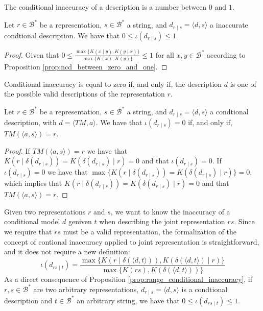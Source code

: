 The conditional inaccuracy of a description is a number between $0$ and $1$.

\begin{proposition}
\label{prop:range_conditional_inaccuracy}
Let $r \in \mathcal{B}^\ast$ be a representation, $s \in \mathcal{B}^\ast$ a string, and $d_{r \mid s} = \langle d, s \rangle$ a inaccurate condtional description. We have that $0 \leq \iota(d_{r \mid s}) \leq 1$.
\end{proposition}
\begin{proof}
Given that $0 \leq \frac{ \max\{ K(x \mid y), K(y \mid x) \} } { \max\{ K(x), K(y) \} } \leq 1$ for all $x, y \in \mathcal{B}^\ast$ according to Proposition \ref{prop:ncd_between_zero_and_one}.
\end{proof}

Conditional inaccuracy is equal to zero if, and only if, the description $d$ is one of the possible valid descriptions of the representation $r$.

\begin{proposition}\label{prop:perfect_description}
Let $r \in \mathcal{B}^\ast$ be a representation, $s \in \mathcal{B}^\ast$ a string, and $d_{r \mid s} = \langle d, s \rangle$ a condtional description, with $ d = \langle TM, a \rangle$. We have that $\iota(d_{r \mid s}) = 0$ if, and only if, $TM \left(\langle a, s \rangle \right) = r$.
\end{proposition}
\begin{proof}
If $TM \left(\langle a, s \rangle \right) = r$ we have that $K \left( r \mid \delta(d_{r \mid s}) \right) = K \left( \delta(d_{r \mid s}) \mid r \right) = 0$ and that $\iota(d_{r \mid s}) = 0$. If $\iota(d_{r \mid s}) = 0$ we have that $\max\{ K \left( r \mid \delta(d_{r \mid s}) \right) = K \left( \delta(d_{r \mid s}) \mid r \right) \} = 0$, which implies that $K \left( r \mid \delta(d_{r \mid s}) \right) = K \left( \delta(d_{r \mid s}) \mid r \right) = 0$ and that $TM \left(\langle a, s \rangle \right) = r$.
\end{proof}

Given two representations $r$ and $s$, we want to know the inaccuracy of a conditional model $d$ geniven $t$ when describing the joint representation $rs$. Since we require that $rs$ must be a valid representation, the formalization of the concept of contional inaccuracy applied to joint representation is straightforward, and it does not require a new definition:
\[
\iota(d_{rs \mid t}) = \frac{ \max\{ K \left(r \mid \delta(\langle d, t \rangle) \right), K \left( \delta(\langle d, t \rangle) \mid r \right) \} } { \max\{ K(rs), K \left(\delta(\langle d, t \rangle) \right) \} }
\]
As a direct consequence of Proposition \ref{prop:range_conditional_inaccuracy}, if $r, s \in \mathcal{B}^\ast$ are two arbitrary representations, $d_{r \mid s} = \langle d, s \rangle$ is a condtional description and $t \in \mathcal{B}^\ast$ an arbitrary string, we have that $0 \leq \iota(d_{rs \mid t}) \leq 1$.

